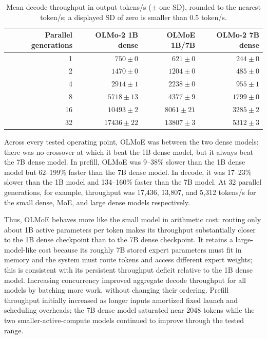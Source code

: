 \documentclass[10pt]{article}
\begin{document}
\begin{table}[ht]
\centering
\small
\begin{tabular}{rrrr}
\toprule
Parallel generations & OLMo-2 1B dense & OLMoE 1B/7B & OLMo-2 7B dense \\
\midrule
1  & $750\!\pm\!0$       & $621\!\pm\!0$       & $244\!\pm\!0$ \\
2  & $1470\!\pm\!0$      & $1204\!\pm\!0$      & $485\!\pm\!0$ \\
4  & $2914\!\pm\!1$      & $2238\!\pm\!0$      & $955\!\pm\!1$ \\
8  & $5718\!\pm\!13$     & $4377\!\pm\!9$      & $1799\!\pm\!0$ \\
16 & $10493\!\pm\!2$     & $8061\!\pm\!21$     & $3285\!\pm\!2$ \\
32 & $17436\!\pm\!22$    & $13807\!\pm\!3$     & $5312\!\pm\!3$ \\
\bottomrule
\end{tabular}
\caption{Mean decode throughput in output tokens/s ($\pm$ one SD), rounded to
the nearest token/s; a displayed SD of zero is smaller than 0.5 token/s.}
\end{table}

Across every tested operating point, OLMoE was between the two dense models:
there was no crossover at which it beat the 1B dense model, but it always beat
the 7B dense model.  In prefill, OLMoE was 9--38\% slower than the 1B dense
model but 62--199\% faster than the 7B dense model.  In decode, it was 17--23\%
slower than the 1B model and 134--160\% faster than the 7B model.  At 32
parallel generations, for example, throughput was 17,436, 13,807, and 5,312
tokens/s for the small dense, MoE, and large dense models respectively.

Thus, OLMoE behaves more like the small model in arithmetic cost: routing only
about 1B active parameters per token makes its throughput substantially closer
to the 1B dense checkpoint than to the 7B dense checkpoint.  It retains a
large-model-like cost because its roughly 7B stored expert parameters must fit
in memory and the system must route tokens and access different expert weights;
this is consistent with its persistent throughput deficit relative to the 1B
dense model.  Increasing concurrency improved aggregate decode throughput for
all models by batching more work, without changing their ordering.  Prefill
throughput initially increased as longer inputs amortized fixed launch and
scheduling overheads; the 7B dense model saturated near 2048 tokens while the
two smaller-active-compute models continued to improve through the tested
range.
\end{document}
